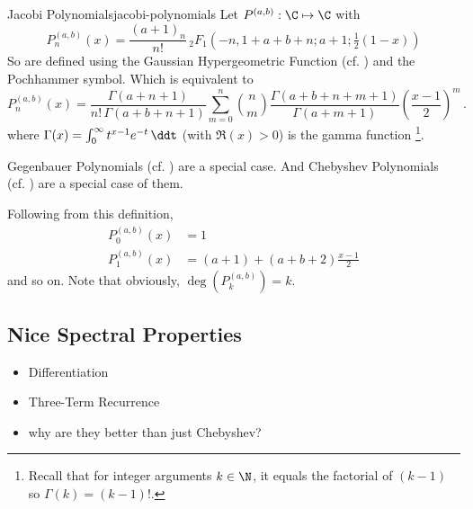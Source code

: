\begin{definition}{Jacobi Polynomials}{jacobi-polynomials}
  Let $P^{(a, b)}: \C \mapsto \C$ with
  \[P^{(a,b)}_n(x) = {\frac{(a +1)_{n}}{n!}}\,{}_{2}F_{1}\left(-n,1+a +b +n;a +1;{\tfrac  {1}{2}}(1-x)\right)\]
  So are defined using the Gaussian Hypergeometric Function (cf. ) and the Pochhammer symbol.
  Which is equivalent to
  $$P_{n}^{{(a, b)}}(x)={\frac  {\Gamma (a +n+1)}{n!\,\Gamma (a +b +n+1)}}\sum _{{m=0}}^{n}{n \choose m}{\frac  {\Gamma (a +b +n+m+1)}{\Gamma (a +m+1)}}\left({\frac{x-1}{2}}\right)^{m}\,.$$
  where $\Gamma (x)=\int _{0}^{\infty }t^{x-1}e^{-t}\,\ddt$ (with $\Re(x)>0$) is the gamma function \footnote{Recall that for integer arguments $k \in \N$, it equals the factorial of $(k-1)$ so $\Gamma(k) = (k-1)!$.}.

  Gegenbauer Polynomials (cf. ) are a special case. And
  Chebyshev Polynomials (cf. ) are a special case of them.
\end{definition}

Following from this definition,
\begin{align*}
  P_0^{(a, b)}(x)   & = 1                            \\
  P_{1}^{(a, b)}(x) & = (a+1)+(a+b+2){\frac{x-1}{2}}
\end{align*}
and so on. Note that obviously, $\deg\left(P_k^{(a, b)}\right) = k$.

\hypertarget{nice-spectral-properties}{%
  \subsection{Nice Spectral Properties}\label{nice-spectral-properties}}

\begin{itemize}
  \item Differentiation
  \item Three-Term Recurrence
  \item why are they better than just Chebyshev?
\end{itemize}
